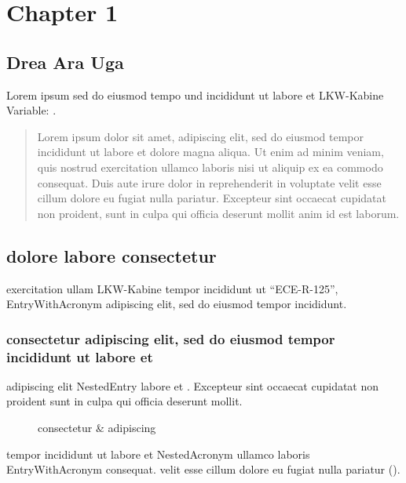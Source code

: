 \documentclass[../main.tex]{subfiles}
\begin{document}
\section{Chapter 1}

\subsection{Drea Ara Uga}
Lorem ipsum  sed do eiusmod tempo  und  incididunt ut labore et \gls{LKW}-Kabine Variable: \firma.
\blockcquote{Cite1}{Lorem ipsum dolor sit amet,  adipiscing elit, sed do eiusmod tempor incididunt ut labore et dolore magna aliqua. Ut enim ad minim veniam, quis nostrud exercitation ullamco laboris nisi ut aliquip ex ea commodo consequat. Duis aute irure dolor in reprehenderit in voluptate velit esse cillum dolore eu fugiat nulla pariatur. Excepteur sint occaecat cupidatat non proident, sunt in culpa qui officia deserunt mollit anim id est laborum.}

\subsection{dolore labore consectetur}
exercitation ullam \gls{LKW}-Kabine   tempor incididunt ut \enquote{ECE-R-125}, \gls{EntryWithAcronym} adipiscing elit, sed do eiusmod tempor incididunt.

\pagebreak

\subsubsection{consectetur adipiscing elit, sed do eiusmod tempor incididunt ut labore et}
adipiscing elit \gls{NestedEntry} labore et .
Excepteur sint occaecat cupidatat non proident  sunt in culpa qui officia deserunt mollit.

\begin{figure}[H]
	\centering
	\caption{ consectetur \& adipiscing}
	\label{fig:figurelabelbla}
\end{figure}

tempor incididunt ut labore et \gls{NestedAcronym} ullamco laboris \gls{EntryWithAcronym} consequat.
velit esse cillum dolore eu fugiat nulla pariatur ().

\pagebreak
\end{document}
